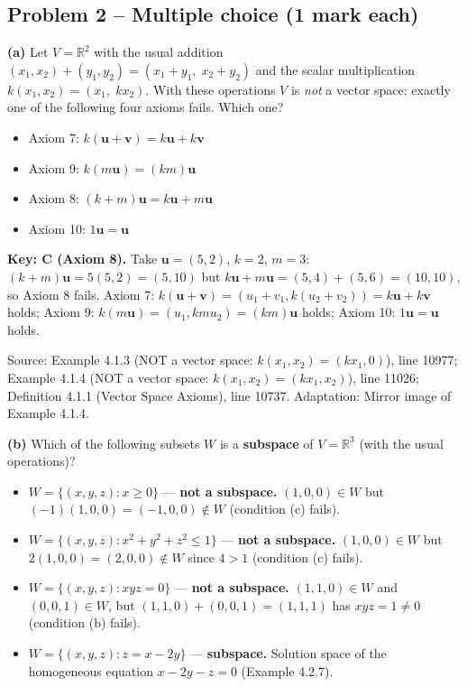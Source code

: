 \documentclass[11pt,a4paper]{article}
\newcommand{\Src}[1]{{\footnotesize\color{black!65}Source: #1}}
\begin{document}
\subsection*{Problem 2 -- Multiple choice (1 mark each)}
\textbf{(a)} Let $V=\mathbb{R}^2$ with the usual addition $(x_1,x_2)+(y_1,y_2)=(x_1+y_1,\;x_2+y_2)$ and the scalar multiplication $k(x_1,x_2)=(x_1,\;kx_2)$. With these operations $V$ is \emph{not} a vector space: exactly one of the following four axioms fails. Which one?\par
\begin{itemize}[leftmargin=8mm,itemsep=0pt]\item[A] Axiom 7: $k(\mathbf{u}+\mathbf{v})=k\mathbf{u}+k\mathbf{v}$\item[B] Axiom 9: $k(m\mathbf{u})=(km)\mathbf{u}$\item[C$^{\ast}$] Axiom 8: $(k+m)\mathbf{u}=k\mathbf{u}+m\mathbf{u}$\item[D] Axiom 10: $1\mathbf{u}=\mathbf{u}$\end{itemize}
\textbf{Key: C (Axiom 8).} Take $\mathbf{u}=(5,2)$, $k=2$, $m=3$: $(k+m)\mathbf{u}=5(5,2)=(5,10)$ but $k\mathbf{u}+m\mathbf{u}=(5,4)+(5,6)=(10,10)$, so Axiom 8 fails. Axiom 7: $k(\mathbf{u}+\mathbf{v})=(u_1+v_1,k(u_2+v_2))=k\mathbf{u}+k\mathbf{v}$ holds; Axiom 9: $k(m\mathbf{u})=(u_1,kmu_2)=(km)\mathbf{u}$ holds; Axiom 10: $1\mathbf{u}=\mathbf{u}$ holds.\par
\Src{Example 4.1.3 (NOT a vector space: $k(x_1,x_2)=(kx_1,0)$), line 10977; Example 4.1.4 (NOT a vector space: $k(x_1,x_2)=(kx_1,x_2)$), line 11026; Definition 4.1.1 (Vector Space Axioms), line 10737. Adaptation: Mirror image of Example 4.1.4.}\par
\textbf{(b)} Which of the following subsets $W$ is a \textbf{subspace} of $V=\mathbb{R}^3$ (with the usual operations)?\par
\begin{itemize}[leftmargin=8mm,itemsep=0pt]\item[A] $W=\{(x,y,z) : x\ge0\}$ --- \textbf{not a subspace.} $(1,0,0)\in W$ but $(-1)(1,0,0)=(-1,0,0)\notin W$ (condition (c) fails).\item[B] $W=\{(x,y,z) : x^2+y^2+z^2\le1\}$ --- \textbf{not a subspace.} $(1,0,0)\in W$ but $2(1,0,0)=(2,0,0)\notin W$ since $4>1$ (condition (c) fails).\item[C] $W=\{(x,y,z) : xyz=0\}$ --- \textbf{not a subspace.} $(1,1,0)\in W$ and $(0,0,1)\in W$, but $(1,1,0)+(0,0,1)=(1,1,1)$ has $xyz=1\neq0$ (condition (b) fails).\item[D$^{\ast}$] $W=\{(x,y,z) : z=x-2y\}$ --- \textbf{subspace.} Solution space of the homogeneous equation $x-2y-z=0$ (Example 4.2.7).\end{itemize}
\end{document}
